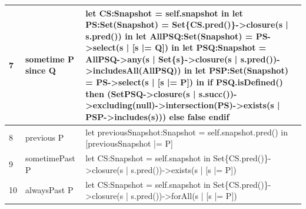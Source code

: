 \begin{table}[htbp]
\begin{tabularx}{\textwidth}{|>{\footnotesize}p{0.8cm}|>{\scriptsize\raggedright\arraybackslash}p{4cm}|>{\scriptsize\raggedright\arraybackslash}X|}
    \hline
    7 &
    sometime P since Q &
    let CS:Snapshot = self.snapshot
    in let PS:Set(Snapshot) = Set\{CS.pred()\}->closure(s | s.pred())
    in let AllPSQ:Set(Snapshot) = PS->select(s | [s |= Q])
    in let PSQ:Snapshot = AllPSQ->any(s | Set\{s\}->closure(s | s.pred())->includesAll(AllPSQ))
    in let PSP:Set(Snapshot) = PS->select(s | [s |= P])
    in if PSQ.isDefined() then (Set{PSQ}->closure(s | s.succ())->excluding(null)->intersection(PS)->exists(s | PSP->includes(s))) else false endif \\ 
    \hline
    8 &
    previous P &
    let previousSnapshot:Snapshot = self.snapshot.pred() in [previousSnapshot |= P] \\
    \hline
    9 &
    sometimePast P &
    let CS:Snapshot = self.snapshot in Set\{CS.pred()\}->closure(s | s.pred())->exists(s | [s |= P]) \\
    \hline
    10 &
    alwaysPast P &
    let CS:Snapshot = self.snapshot in Set\{CS.pred()\}->closure(s | s.pred())->forAll(s | [s |= P]) \\
    \hline
\end{tabularx}
\end{table}
